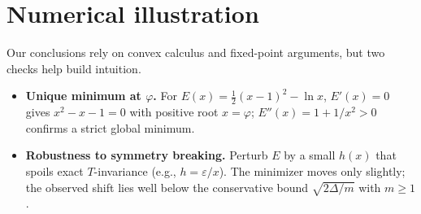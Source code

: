 \documentclass[11pt]{article}
\theoremstyle{remark}
\theoremstyle{definition}
\newcommand{\ph}{\varphi}
\newcommand{\eps}{\varepsilon}
\begin{document}
\section{Numerical illustration}
Our conclusions rely on convex calculus and fixed-point arguments, but two checks help build intuition.
\begin{itemize}[leftmargin=1.15em]
  \item \textbf{Unique minimum at $\ph$.} For $E(x)=\tfrac12(x-1)^2-\ln x$, $E'(x)=0$ gives $x^2-x-1=0$ with positive root $x=\ph$; $E''(x)=1+1/x^2>0$ confirms a strict global minimum.
  \item \textbf{Robustness to symmetry breaking.} Perturb $E$ by a small $h(x)$ that spoils exact $T$-invariance (e.g., $h=\eps/x$). The minimizer moves only slightly; the observed shift lies well below the conservative bound $\sqrt{2\Delta/m}$ with $m\ge1$.
\end{itemize}
\end{document}
